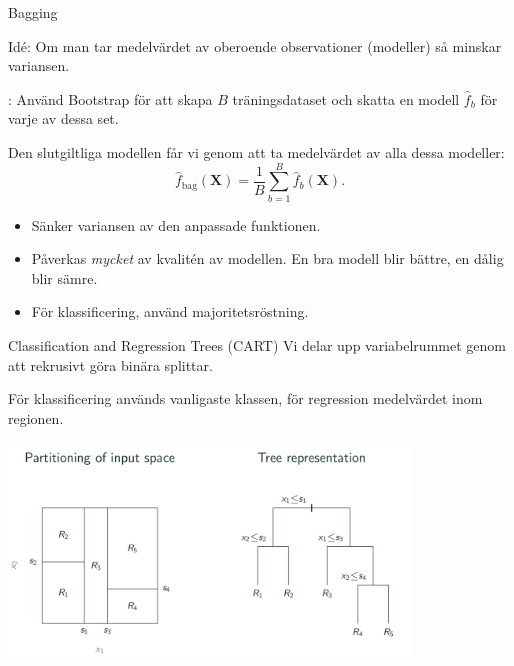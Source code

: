 \documentclass[10pt,english]{beamer}
\begin{document}
\begin{frame}{Bagging}
    
    Idé: Om man tar medelvärdet av oberoende observationer (modeller) så minskar variansen.

    \begin{bluebox}
        : Använd Bootstrap för att skapa $B$ träningsdataset och skatta en modell $\hat{f}_b$ för varje av dessa set.

        Den slutgiltliga modellen får vi genom att ta medelvärdet av alla dessa modeller:
        \begin{equation*}
            \hat{f}_{\text{bag}}(\mathbf{X}) = \frac{1}{B}\sum_{b=1}^{B}\hat{f}_b(\mathbf{X}).
        \end{equation*}
    \end{bluebox}

    \begin{itemize}
        \item Sänker variansen av den anpassade funktionen.
        \item Påverkas \emph{mycket} av kvalitén av modellen. En bra modell blir bättre, en dålig blir sämre.
        \item För klassificering, använd majoritetsröstning.
    \end{itemize}

\end{frame}

\begin{frame}{Classification and Regression Trees (CART)}
    Vi delar upp variabelrummet genom att rekrusivt göra binära splittar.

    För klassificering används vanligaste klassen, för regression medelvärdet inom regionen.

    \includegraphics[width=0.8\textwidth]{figs/tree_fredrik.png}
\end{frame}
\end{document}
